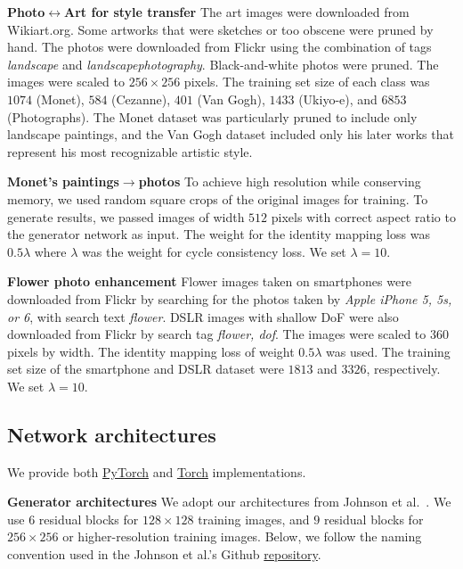 {\bf Photo$\leftrightarrow$Art for style transfer} The art images were downloaded from Wikiart.org. Some artworks that were sketches or too obscene were pruned by hand. The photos were downloaded from Flickr using the combination of tags \textit{landscape} and \textit{landscapephotography}. Black-and-white photos were pruned. The images were scaled to $256 \times 256$ pixels. The training set size of each class was $1074$ (Monet), $584$ (Cezanne), $401$ (Van Gogh),  $1433$ (Ukiyo-e), and $6853$ (Photographs). The Monet dataset was particularly pruned to include only landscape paintings, and the Van Gogh dataset  included only his later works that represent his most recognizable artistic style. 

{\bf Monet's paintings$\rightarrow$photos} To achieve high resolution while conserving memory, we used random square crops of the original images for training. To generate results, we passed images of width $512$ pixels with correct aspect ratio to the generator network as input. The weight for the identity mapping loss was $0.5\lambda$ where $\lambda$ was the weight for cycle consistency loss. We set $\lambda=10$.

{\bf Flower photo enhancement} Flower images taken on smartphones were downloaded from Flickr by searching for the photos taken by 
\textit{Apple iPhone 5, 5s, or 6}, with search text \textit{flower}. DSLR images with shallow DoF were also downloaded from Flickr by search tag \textit{flower, dof}. The images were scaled to $360$ pixels by width. The identity mapping loss of weight $0.5\lambda$ was used. The training set size of the smartphone and DSLR dataset were $1813$ and $3326$, respectively. We set $\lambda=10$.


\subsection{Network architectures}
We provide both \href{https://github.com/junyanz/pytorch-CycleGAN-and-pix2pix}{PyTorch} and \href{https://github.com/junyanz/CycleGAN}{Torch} implementations. 

{\bf Generator architectures}
We adopt our architectures from Johnson et al.~. We use $6$ residual blocks for $128\times128$ training images, and $9$ residual blocks for $256\times 256$ or higher-resolution training images. Below, we follow the naming convention used in the Johnson et al.'s Github \href{https://github.com/jcjohnson/fast-neural-style}{repository}.

